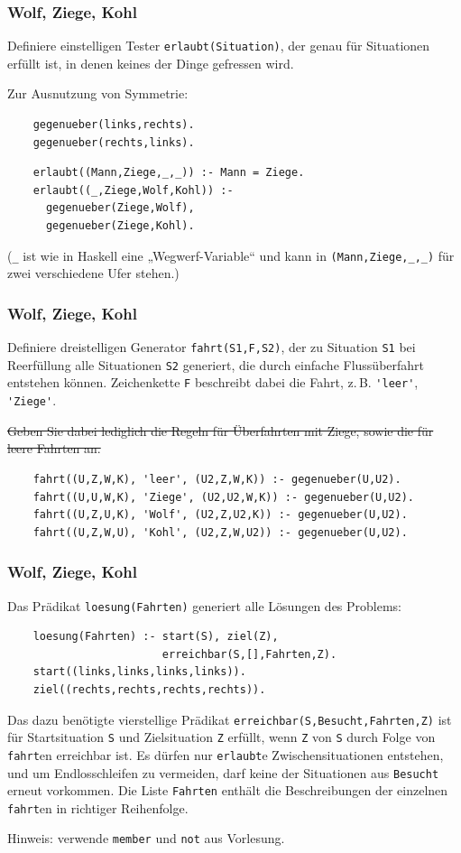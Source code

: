 \documentclass{beamer}
\begin{document}
\begin{frame}[fragile]
  \frametitle{Wolf, Ziege, Kohl}
  Definiere einstelligen Tester \lstinline{erlaubt(Situation)},
  der genau für Situationen erfüllt ist, in denen keines der Dinge gefressen wird.
  
  \pause
  Zur Ausnutzung von Symmetrie:
  \begin{lstlisting}
    gegenueber(links,rechts).
    gegenueber(rechts,links).
  \end{lstlisting}
  \pause
  \begin{lstlisting}
    erlaubt((Mann,Ziege,_,_)) :- Mann = Ziege.
    erlaubt((_,Ziege,Wolf,Kohl)) :-
      gegenueber(Ziege,Wolf),
      gegenueber(Ziege,Kohl).
  \end{lstlisting}
  
  (\lstinline{_} ist wie in Haskell eine „Wegwerf-Variable“
  und kann in \lstinline{(Mann,Ziege,_,_)} für zwei verschiedene Ufer stehen.)
\end{frame}

\begin{frame}[fragile]
  \frametitle{Wolf, Ziege, Kohl}
  Definiere dreistelligen Generator \lstinline{fahrt(S1,F,S2)},
  der zu Situation \lstinline{S1} bei Reerfüllung alle Situationen \lstinline{S2} generiert,
  die durch einfache Flussüberfahrt entstehen können.
  Zeichenkette \lstinline{F} beschreibt dabei die Fahrt, z.\,B. \lstinline{'leer'}, \lstinline{'Ziege'}.
  
  \sout{Geben Sie dabei lediglich die Regeln für Überfahrten mit Ziege, sowie die für leere Fahrten an.}

  \pause
  \begin{lstlisting}
    fahrt((U,Z,W,K), 'leer', (U2,Z,W,K)) :- gegenueber(U,U2).
    fahrt((U,U,W,K), 'Ziege', (U2,U2,W,K)) :- gegenueber(U,U2).
    fahrt((U,Z,U,K), 'Wolf', (U2,Z,U2,K)) :- gegenueber(U,U2).
    fahrt((U,Z,W,U), 'Kohl', (U2,Z,W,U2)) :- gegenueber(U,U2).
  \end{lstlisting}
\end{frame}

\begin{frame}[fragile]
  \frametitle{Wolf, Ziege, Kohl}
  Das Prädikat \lstinline{loesung(Fahrten)} generiert alle Lösungen des Problems:
  \begin{lstlisting}
    loesung(Fahrten) :- start(S), ziel(Z),
                        erreichbar(S,[],Fahrten,Z).
    start((links,links,links,links)).
    ziel((rechts,rechts,rechts,rechts)).
  \end{lstlisting}
  Das dazu benötigte vierstellige Prädikat \lstinline{erreichbar(S,Besucht,Fahrten,Z)}
  ist für Startsituation \lstinline{S} und Zielsituation \lstinline{Z} erfüllt,
  wenn \lstinline{Z} von \lstinline{S} durch Folge von \lstinline{fahrt}en erreichbar ist.
  Es dürfen nur \lstinline{erlaubt}e Zwischensituationen entstehen,
  und um Endlosschleifen zu vermeiden, darf keine der Situationen aus \lstinline{Besucht} erneut vorkommen.
  Die Liste \lstinline{Fahrten} enthält die Beschreibungen der einzelnen \lstinline{fahrt}en in richtiger Reihenfolge.
  
  Hinweis: verwende \lstinline{member} und \lstinline{not} aus Vorlesung.
\end{frame}
\end{document}
